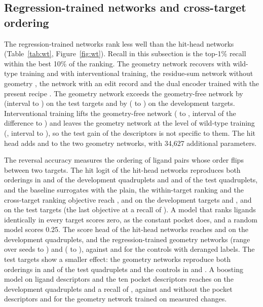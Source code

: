 \subsection{Regression-trained networks and cross-target ordering}

The regression-trained networks rank less well than the hit-head networks (Table~\ref{tab:wt}, Figure~\ref{fig:wt}). Recall in this subsection is the top-1\% recall within the best 10\% of the ranking. The geometry network recovers \wtRTestRsgWt{} with wild-type training and \wtRTestRsgInt{} with interventional training, the residue-sum network without geometry \wtRTestRsWt{}, the network with an edit record \wtRTestRseWt{} and the dual encoder trained with the present recipe \wtRTestBfiveWt{}. The geometry network exceeds the geometry-free network by \wtdTestRsgWtMinusRsWt{} (interval \wtdLoTestRsgWtMinusRsWt{} to \wtdHiTestRsgWtMinusRsWt{}) on the test targets and by \wtdDevRsgWtMinusRsWt{} (\wtdLoDevRsgWtMinusRsWt{} to \wtdHiDevRsgWtMinusRsWt{}) on the development targets. Interventional training lifts the geometry-free network (\wtRTestRsWt{} to \wtRTestRsInt{}, interval of the difference \wtdLoTestRsIntMinusRsWt{} to \wtdHiTestRsIntMinusRsWt{}) and leaves the geometry network at the level of wild-type training (\wtdTestRsgIntMinusRsgWt{}, interval \wtdLoTestRsgIntMinusRsgWt{} to \wtdHiTestRsgIntMinusRsgWt{}), so the test gain of the descriptors is not specific to them. The hit head adds \hndTestRsghWtMinusRsgWt{} and \hndTestRsghIntMinusRsgInt{} to the two geometry networks, with 34,627 additional parameters.

The reversal accuracy measures the ordering of ligand pairs whose order flips between two targets. The hit logit of the hit-head networks reproduces both orderings in \hnJDevRsghWt{} and \hnJDevRsghInt{} of the development quadruplets and \hnJTestRsghWt{} and \hnJTestRsghInt{} of the test quadruplets, and the baseline surrogates with the plain, the within-target ranking and the cross-target ranking objective reach \hitJDevCZero{}, \hitJDevCOne{} and \hitJDevCTwo{} on the development targets and \hitJTestCZero{}, \hitJTestCOne{} and \hitJTestCTwo{} on the test targets (the last objective at a recall of \hitRTestCTwo{}). A model that ranks ligands identically in every target scores zero, as the constant pocket does, and a random model scores 0.25. The score head of the hit-head networks reaches \hnScoreJDevRsghWt{} and \hnScoreJDevRsghInt{} on the development quadruplets, and the regression-trained geometry networks \wtJDevRsgWt{} (range over \wtNDevRsgWt{} seeds \wtJminDevRsgWt{} to \wtJmaxDevRsgWt{}) and \wtJDevRsgInt{} (\wtJminDevRsgInt{} to \wtJmaxDevRsgInt{}), against \wtJDevRsgShmTwo{} and \wtJDevRsgShaTwo{} for the controls with deranged labels. The test targets show a smaller effect: the geometry networks reproduce both orderings in \wtJTestRsgWt{} and \wtJTestRsgInt{} of the test quadruplets and the controls in \wtJTestRsgShmTwo{} and \wtJTestRsgShaTwo{}. A boosting model on ligand descriptors and the ten pocket descriptors reaches \wtJDevBoostGeo{} on the development quadruplets and a recall of \wtRDevBoostGeo{}, against \wtJDevBoostLig{} and \wtRDevBoostLig{} without the pocket descriptors and \wtJDevRsgInt{} for the geometry network trained on measured changes.

